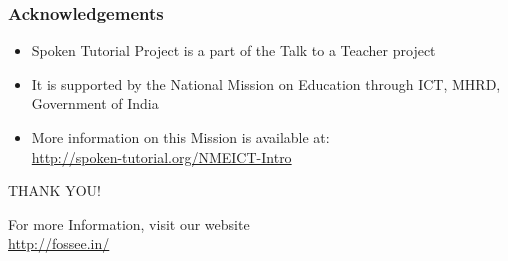 \documentclass[17pt,compress]{beamer}
\begin{document}
\begin{frame}
\frametitle{Acknowledgements}
\begin{itemize}
\item Spoken Tutorial Project is a part of the Talk to a Teacher  project 
\item It is supported by the National Mission on Education through  ICT, MHRD, Government of India 
\item More information on this Mission is available at: \\{\color{blue}\url{http://spoken-tutorial.org/NMEICT-Intro}}
\end{itemize}
\end{frame}

\begin{frame}
  \begin{block}{}
  \begin{center}
  {\Large THANK YOU!} 
  \end{center}
  \end{block}
\begin{block}{}
  \begin{center}
    For more Information, visit our website\\
    {\color{blue}\url{http://fossee.in/}}
  \end{center}  
  \end{block}
\end{frame}
\end{document}
